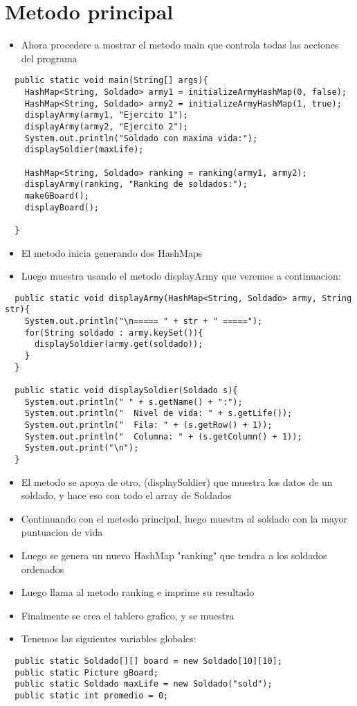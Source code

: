 \section{Metodo principal}
\begin{itemize}
  \item Ahora procedere a mostrar el metodo main que controla todas las acciones del programa
\end{itemize}
\begin{lstlisting}
  public static void main(String[] args){
    HashMap<String, Soldado> army1 = initializeArmyHashMap(0, false);
    HashMap<String, Soldado> army2 = initializeArmyHashMap(1, true);
    displayArmy(army1, "Ejercito 1");
    displayArmy(army2, "Ejercito 2");
    System.out.println("Soldado con maxima vida:");
    displaySoldier(maxLife);

    HashMap<String, Soldado> ranking = ranking(army1, army2);
    displayArmy(ranking, "Ranking de soldados:");
    makeGBoard();
    displayBoard();

  }
\end{lstlisting}
\begin{itemize}
  \item El metodo inicia generando dos HashMaps
  \item Luego muestra usando el metodo displayArmy que veremos a continuacion:
\end{itemize}
\begin{lstlisting}
  public static void displayArmy(HashMap<String, Soldado> army, String str){
    System.out.println("\n===== " + str + " =====");
    for(String soldado : army.keySet()){
      displaySoldier(army.get(soldado));
    }
  }

  public static void displaySoldier(Soldado s){
    System.out.println(" " + s.getName() + ":");
    System.out.println("  Nivel de vida: " + s.getLife());
    System.out.println("  Fila: " + (s.getRow() + 1));
    System.out.println("  Columna: " + (s.getColumn() + 1));
    System.out.print("\n");
  }
\end{lstlisting}
\begin{itemize}
  \item El metodo se apoya de otro, (displaySoldier) que muestra los datos de un soldado, y hace eso con todo el array de Soldados
  \item Continuando con el metodo principal, luego muestra al soldado con la mayor puntuacion de vida
  \item Luego se genera un nuevo HashMap "ranking" que tendra a los soldados ordenados
  \item Luego llama al metodo ranking e imprime su resultado
  \item Finalmente se crea el tablero grafico, y se muestra
  \item Tenemos las siguientes variables globales:
\end{itemize}
\begin{lstlisting}
  public static Soldado[][] board = new Soldado[10][10];
  public static Picture gBoard;
  public static Soldado maxLife = new Soldado("sold");
  public static int promedio = 0;
\end{lstlisting}

